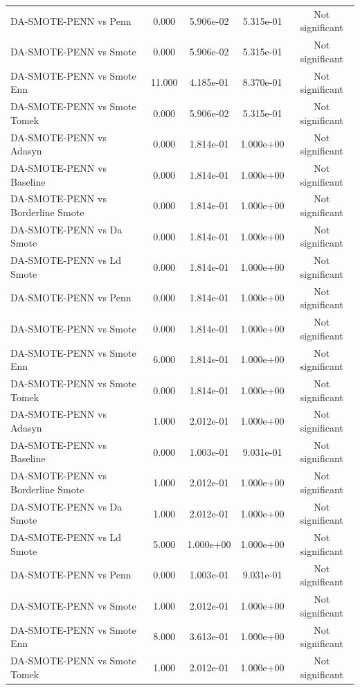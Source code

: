 \begin{table}[htb]
\begin{tabular}{lcccc}
\\
DA-SMOTE-PENN vs Penn & 0.000 & 5.906e-02 & 5.315e-01 & Not significant
\\
DA-SMOTE-PENN vs Smote & 0.000 & 5.906e-02 & 5.315e-01 & Not significant
\\
DA-SMOTE-PENN vs Smote Enn & 11.000 & 4.185e-01 & 8.370e-01 & Not significant
\\
DA-SMOTE-PENN vs Smote Tomek & 0.000 & 5.906e-02 & 5.315e-01 & Not significant
\\
DA-SMOTE-PENN vs Adasyn & 0.000 & 1.814e-01 & 1.000e+00 & Not significant
\\
DA-SMOTE-PENN vs Baseline & 0.000 & 1.814e-01 & 1.000e+00 & Not significant
\\
DA-SMOTE-PENN vs Borderline Smote & 0.000 & 1.814e-01 & 1.000e+00 & Not significant
\\
DA-SMOTE-PENN vs Da Smote & 0.000 & 1.814e-01 & 1.000e+00 & Not significant
\\
DA-SMOTE-PENN vs Ld Smote & 0.000 & 1.814e-01 & 1.000e+00 & Not significant
\\
DA-SMOTE-PENN vs Penn & 0.000 & 1.814e-01 & 1.000e+00 & Not significant
\\
DA-SMOTE-PENN vs Smote & 0.000 & 1.814e-01 & 1.000e+00 & Not significant
\\
DA-SMOTE-PENN vs Smote Enn & 6.000 & 1.814e-01 & 1.000e+00 & Not significant
\\
DA-SMOTE-PENN vs Smote Tomek & 0.000 & 1.814e-01 & 1.000e+00 & Not significant
\\
DA-SMOTE-PENN vs Adasyn & 1.000 & 2.012e-01 & 1.000e+00 & Not significant
\\
DA-SMOTE-PENN vs Baseline & 0.000 & 1.003e-01 & 9.031e-01 & Not significant
\\
DA-SMOTE-PENN vs Borderline Smote & 1.000 & 2.012e-01 & 1.000e+00 & Not significant
\\
DA-SMOTE-PENN vs Da Smote & 1.000 & 2.012e-01 & 1.000e+00 & Not significant
\\
DA-SMOTE-PENN vs Ld Smote & 5.000 & 1.000e+00 & 1.000e+00 & Not significant
\\
DA-SMOTE-PENN vs Penn & 0.000 & 1.003e-01 & 9.031e-01 & Not significant
\\
DA-SMOTE-PENN vs Smote & 1.000 & 2.012e-01 & 1.000e+00 & Not significant
\\
DA-SMOTE-PENN vs Smote Enn & 8.000 & 3.613e-01 & 1.000e+00 & Not significant
\\
DA-SMOTE-PENN vs Smote Tomek & 1.000 & 2.012e-01 & 1.000e+00 & Not significant

\end{tabular}
\end{table}
